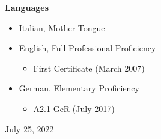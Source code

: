 \documentclass[11pt]{article}
\begin{document}

\vspace*{2.5ex}
\noindent
{\Large\bf Languages}

\begin{itemize}
\item Italian, Mother Tongue
\item English, Full Professional Proficiency
\begin{itemize}
  \item First Certificate (March 2007)
\end{itemize}
\item German, Elementary Proficiency
\begin{itemize}
  \item A2.1 GeR (July 2017)
\end{itemize}
\end{itemize}


\vspace*{4ex}
\noindent
July 25, 2022

\end{document}

